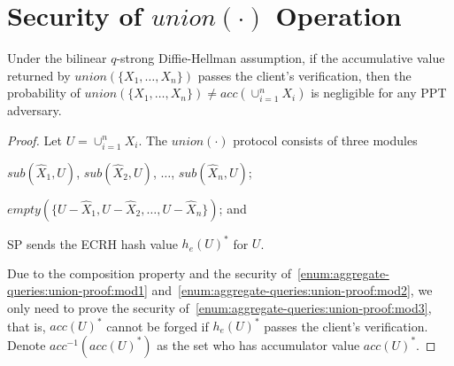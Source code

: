 \section{Security of \texorpdfstring{$union(\cdot)$}{union(\textcdot)} Operation}

\begin{lemma}\label{lem:aggregate-queries:union}
  Under the bilinear $q$-strong Diffie-Hellman assumption, if the accumulative value returned by $union(\{X_1,\dots,X_n\})$ passes the client's verification, then the probability of $union(\{X_1,\dots,X_n\}) \neq acc(\cup_{i=1}^n X_i)$ is negligible for any PPT adversary.
\end{lemma}
\begin{proof}
  Let $U = \cup_{i=1}^n X_i$. The $union(\cdot)$ protocol consists of three modules
  \begin{inlineenum}
  \item $sub(\widehat{X}_1, U)$, $sub(\widehat{X}_2, U)$, $\dots$, $sub(\widehat{X}_n, U)$;%
    \label{enum:aggregate-queries:union-proof:mod1}
  \item $empty(\{U-\widehat{X}_1, U-\widehat{X}_2, \dots, U -\widehat{X}_n\})$; and%
    \label{enum:aggregate-queries:union-proof:mod2}
  \item SP sends the ECRH hash value ${h_e(U)}^*$ for $U$.%
    \label{enum:aggregate-queries:union-proof:mod3}
  \end{inlineenum}
  Due to the composition property and the security of~\ref{enum:aggregate-queries:union-proof:mod1} and~\ref{enum:aggregate-queries:union-proof:mod2}, we only need to prove the security of~\ref{enum:aggregate-queries:union-proof:mod3}, that is, ${acc(U)}^*$ cannot be forged if ${h_e(U)}^*$ passes the client's verification. Denote $acc^{-1}({acc(U)}^*)$ as the set who has accumulator value ${acc(U)}^*$.


\end{proof}
